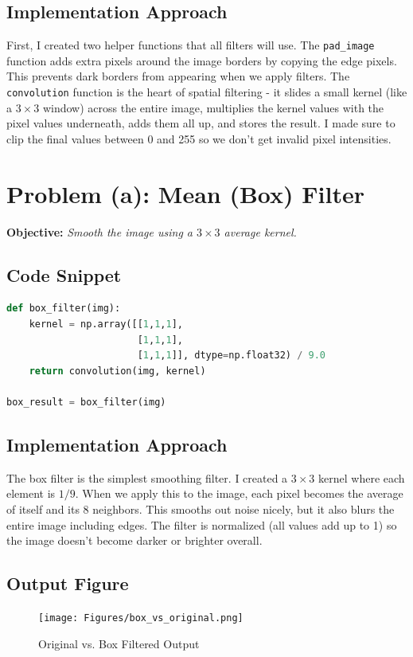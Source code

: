 \documentclass[12pt,a4paper]{report}
\begin{document}
\subsection*{Implementation Approach}
First, I created two helper functions that all filters will use. The \texttt{pad\_image} function adds extra pixels around the image borders by copying the edge pixels. This prevents dark borders from appearing when we apply filters. The \texttt{convolution} function is the heart of spatial filtering - it slides a small kernel (like a \(3\times3\) window) across the entire image, multiplies the kernel values with the pixel values underneath, adds them all up, and stores the result. I made sure to clip the final values between 0 and 255 so we don't get invalid pixel intensities.

\section{Problem (a): Mean (Box) Filter}
\textbf{Objective:} \textit{Smooth the image using a \(3\times 3\) average kernel.}

\subsection{Code Snippet}
\begin{lstlisting}[language=Python, caption={Mean (Box) Filter}]
def box_filter(img):
    kernel = np.array([[1,1,1],
                       [1,1,1],
                       [1,1,1]], dtype=np.float32) / 9.0
    return convolution(img, kernel)

box_result = box_filter(img)
\end{lstlisting}

\subsection{Implementation Approach}
The box filter is the simplest smoothing filter. I created a \(3\times 3\) kernel where each element is \(1/9\). When we apply this to the image, each pixel becomes the average of itself and its 8 neighbors. This smooths out noise nicely, but it also blurs the entire image including edges. The filter is normalized (all values add up to 1) so the image doesn't become darker or brighter overall.

\subsection{Output Figure}
\begin{figure}[H]
\centering
\texttt{[image: Figures/box\_vs\_original.png]}
\caption{Original vs. Box Filtered Output}
\end{figure}
\end{document}
